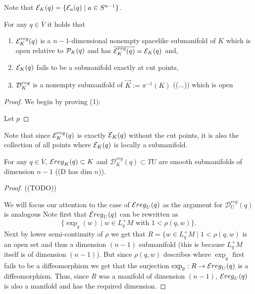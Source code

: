 Note that $\mathcal{E}_K(q) = \{ \mathcal{E}_a(q) \mid a\in S^{n-1} \}$.
\begin{proposition}\label{prop:submanifolds}
For any $q\in \overline{V}$ it holds that
\begin{enumerate}[label={\textnormal{(\arabic*)}}]
    \item $\mathcal{E}^{reg}_K(q)$ is a $n-1$-dimensional nonempty spacelike submanifold of $K$ which is open relative to $\mathcal{P}_K(q)$ and has $\overline{\mathcal{E}^{reg}_K(q)} = \mathcal{E}_K(q)$ and,
    \item $\mathcal{E}_K(q)$ fails to be a submanifold exactly at cut points,
    \item $\mathcal{D}^{reg}_K$ is a nonempty submanifold of $\overrightarrow{K}:=\pi^{-1}(K)$ ((...)) which is open 
\end{enumerate}
\end{proposition}
\begin{proof}
We begin by proving (1):

Let $p$

\end{proof}

Note that since $\mathcal{E}^{reg}_K(q)$ is exactly $\mathcal{E}_K(q)$ without the cut points, it is also the collection of all points where $\mathcal{E}_K(q)$ is locally a submanifold.

\begin{proposition} For any $q\in \overline{V}$, $\mathcal{E}{reg}_K(q)\subset K$ and $\mathcal{D}^{reg}_K(q)\subset TU$ are smooth submanifolds of dimension $n-1$ ((D has dim $n$)).
\end{proposition}
\begin{proof}
((TODO))


We will focus our attention to the case of $\mathcal{E}{reg}_U(q)$ as the argument for  $\mathcal{D}^{reg}_U(q)$ is analogous
Note first that $\mathcal{E}{reg}_U(q)$ can be rewritten as 
\[
    \{\exp_q(w) \mid  w\in L^+_qM \text{ with } 1<\rho(q,w)\}.
\]
Next by lower semi-continuity of $\rho$ we get that $R=\{w\in L^+_qM \mid 1<\rho(q,w)$ is an open set and thus a dimension $(n-1)$ submanifold (this is because $L^+_qM$ itself is of dimension $(n-1)$). But since $\rho(q,w)$ describes where $\exp_q$ first fails to be a diffeomorphism we get that the surjection $\exp_p:R\to \mathcal{E}{reg}_U(q)$ is a diffeomorphism. Thus, since $R$ was a manifold of dimension $(n-1)$, $\mathcal{E}{reg}_U(q)$ is also a manifold and has the required dimension.
\end{proof}

